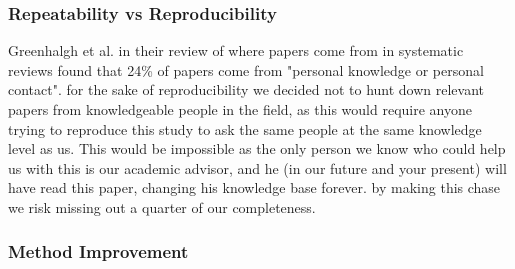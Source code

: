 \subsubsection{Repeatability vs Reproducibility}
Greenhalgh et al.\cite{GreenhalghTrisha2005Eaeo} in their review of where papers come from in systematic reviews found that 24\% of papers come from "personal knowledge or personal contact".
for the sake of reproducibility we decided not to hunt down relevant papers from knowledgeable people in the field, as this would require anyone trying to reproduce this study to ask the same people at the same knowledge level as us.
This would be impossible as the only person we know who could help us with this is our academic advisor, and he (in our future and your present) will have read this paper, changing his knowledge base forever.
by making this chase we risk missing out a quarter of our completeness.

\subsubsection{Method Improvement}


